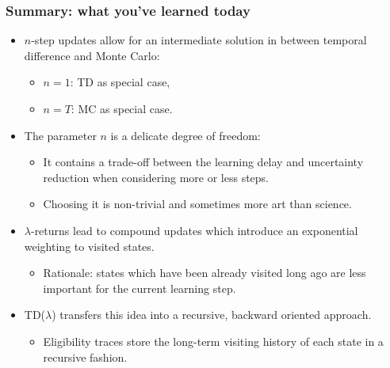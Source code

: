 \begin{frame}
	\frametitle{Summary: what you've learned today}
	\begin{itemize}
		\item $n$-step updates allow for an intermediate solution in between temporal difference and Monte Carlo:
		      \begin{itemize}
			      \item $n=1$: TD as special case,
			      \item $n=T$: MC as special case.
		      \end{itemize}\pause
		\item The parameter $n$ is a delicate degree of freedom:
		      \begin{itemize}
			      \item It contains a trade-off between the learning delay and uncertainty reduction when considering more or less steps.
			      \item Choosing it is non-trivial and sometimes more art than science.
		      \end{itemize}
		\item $\lambda$-returns lead to compound updates which introduce an exponential weighting to visited states.
		      \begin{itemize}
			      \item Rationale: states which have been already visited long ago are less important for the current learning step.
		      \end{itemize}
		\item TD($\lambda$) transfers this idea into a recursive, backward oriented approach.
		      \begin{itemize}
			      \item Eligibility traces store the long-term visiting history of each state in a recursive fashion.
		      \end{itemize}
	\end{itemize}
\end{frame}